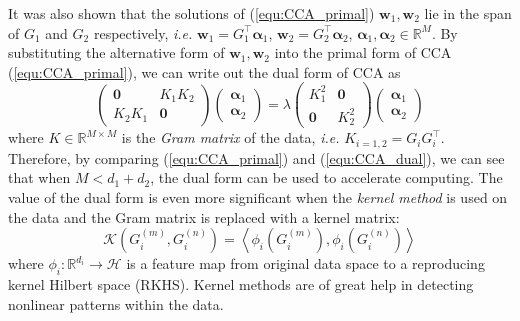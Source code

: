 \documentclass[a4paper]{article}
\begin{document}
It was also shown that the solutions of (\ref{equ:CCA_primal})  $\mathbf{w}_1, \mathbf{w}_2$ lie in the span of $G_1$ and $G_2$ respectively, \emph{i.e.} 
$\mathbf{w}_1=G_1^\top\boldsymbol{\alpha}_1 $, $\mathbf{w}_2=G_2^\top\boldsymbol{\alpha}_2 $, $\boldsymbol{\alpha}_1,\boldsymbol{\alpha}_2\in \mathbb{R}^M$. By substituting the alternative form 
of $\mathbf{w}_1, \mathbf{w}_2$ into the primal form of CCA (\ref{equ:CCA_primal}), we can write out the dual form of CCA \cite{Bie_05,HardoonSS04} as
\small
\begin{equation}
    \left(\begin{array}{cc}
        \mathbf{0} & K_1 K_2 \\
        K_2 K_1     & \mathbf{0}
    \end{array}
    \right) 
    \left( \begin{array}{c} \boldsymbol{\alpha}_1\\ \boldsymbol{\alpha}_2 \end{array} \right)= 
    \lambda 
    \left(\begin{array}{cc}
        K_{1}^2 & \mathbf{0} \\
        \mathbf{0}  & K_{2}^2
    \end{array}
    \right)
    \left( \begin{array}{c} \boldsymbol{\alpha}_1\\ \boldsymbol{\alpha}_2 \end{array} \right)
    \label{equ:CCA_dual}
\end{equation}
\normalsize
where $K\in\mathbb{R}^{M\times M}$ is the \emph{Gram matrix} of the data, \emph{i.e.} $K_{i=1,2}=G_i G_i^\top$.  Therefore, by comparing (\ref{equ:CCA_primal}) and (\ref{equ:CCA_dual}), we can see that 
when $M<d_1+d_2$, the dual form can be used to accelerate computing. The value of the dual form is even more significant when the \emph{kernel method} is used on the data 
and the Gram matrix is replaced with a kernel matrix: 
\begin{equation}
    \mathcal{K}(G_i^{(m)}, G_i^{(n)})=\left\langle \phi_i(G_i^{(m)}),\phi_i(G_i^{(n)}) \right\rangle
    \label{equ:kernel}
\end{equation}
where $\phi_i:\mathbb{R}^{d_i} \to \mathcal{H}$ is a feature map from original data space to a reproducing kernel Hilbert space (RKHS). Kernel methods are of great help in detecting nonlinear patterns within the data.    
\end{document}
